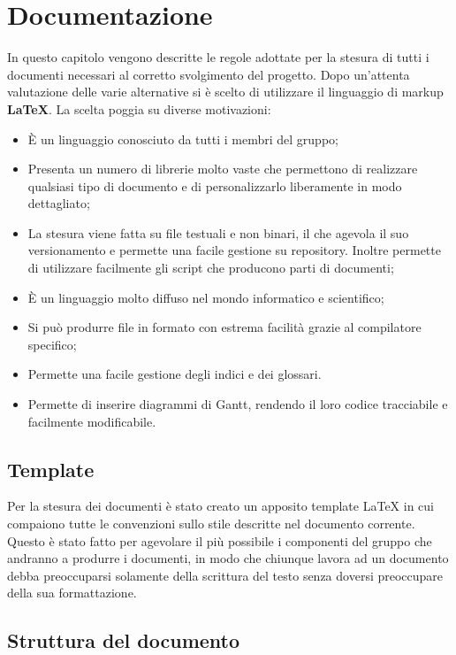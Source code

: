 \section{Documentazione}

In questo capitolo vengono descritte le regole adottate per la stesura di tutti i documenti necessari al corretto svolgimento del progetto. Dopo un'attenta valutazione delle varie alternative si è scelto di utilizzare il linguaggio di markup \textbf{\LaTeX{}}. La scelta poggia su diverse motivazioni:

\begin{itemize}

	\item È un linguaggio conosciuto da tutti i membri del gruppo;
	\item Presenta un numero di librerie molto vaste che permettono di realizzare qualsiasi tipo di documento e di personalizzarlo liberamente in modo dettagliato;
	\item La stesura viene fatta su file testuali e non binari, il che agevola il suo versionamento e permette una facile gestione su repository. Inoltre permette di utilizzare facilmente gli script che producono parti di documenti;
	\item È un linguaggio molto diffuso nel mondo informatico e scientifico;
	\item Si può produrre file in formato  con estrema facilità grazie al compilatore specifico;
	\item Permette una facile gestione degli indici e dei glossari.
	\item Permette di inserire diagrammi di Gantt, rendendo il loro codice tracciabile e facilmente modificabile.

\end{itemize}

\subsection{Template}

Per la stesura dei documenti è stato creato un apposito template \LaTeX{} in cui compaiono tutte le convenzioni sullo stile descritte nel documento corrente. Questo è stato fatto per agevolare il più possibile i componenti del gruppo che andranno a produrre i documenti, in modo che chiunque lavora ad un documento debba preoccuparsi solamente della scrittura del testo senza doversi preoccupare della sua formattazione. 

\subsection{Struttura del documento}

